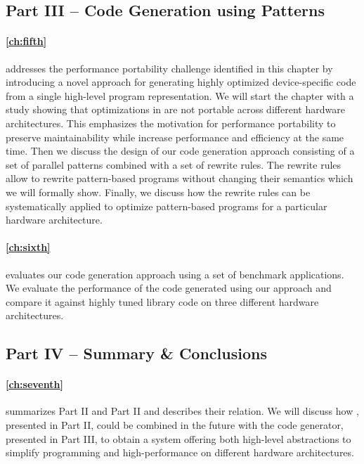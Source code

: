 \subsection*{Part III -- Code Generation using Patterns}

\paragraph{\autoref{ch:fifth}} addresses the performance portability challenge identified in this chapter by introducing a novel approach for generating highly optimized device-specific code from a single high-level program representation.
We will start the chapter with a study showing that optimizations in \OpenCL are not portable across different hardware architectures.
This emphasizes the motivation for performance portability to preserve maintainability while increase performance and efficiency at the same time.
Then we discuss the design of our code generation approach consisting of a set of parallel patterns combined with a set of rewrite rules.
The rewrite rules allow to rewrite pattern-based programs without changing their semantics which we will formally show.
Finally, we discuss how the rewrite rules can be systematically applied to optimize pattern-based programs for a particular hardware architecture.

\paragraph{\autoref{ch:sixth}} evaluates our code generation approach using a set of benchmark applications.
We evaluate the performance of the code generated using our approach and compare it against highly tuned library code on three different hardware architectures.

\subsection*{Part IV -- Summary \& Conclusions}

\paragraph{\autoref{ch:seventh}} summarizes Part II and Part II and describes their relation.
We will discuss how \SkelCL, presented in Part II, could be combined in the future with the code generator, presented in Part III, to obtain a system offering both high-level abstractions to simplify programming and high-performance on different hardware architectures.

